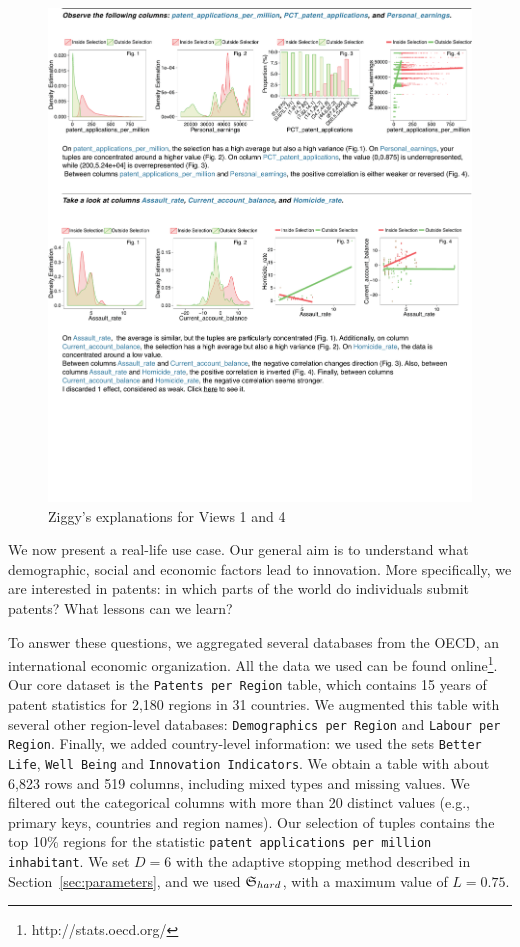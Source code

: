 \begin{figure}[!ht]
  \centering
  \includegraphics[width=1.8\columnwidth]{Figures/ZigUseCase}
  \caption{Ziggy's explanations for Views 1 and 4}
  \label{pic:zigdetail}
\end{figure}
We now present a real-life use case. Our general aim is to understand what
demographic, social and economic factors lead to innovation. More specifically,
we are interested in patents: in which parts of the world do individuals
submit patents? What lessons can we learn?

To answer these questions, we aggregated several databases from the OECD, an
international economic organization. All the data we used can be found
online\footnote{http://stats.oecd.org/}. Our core dataset is the
\texttt{Patents per Region} table, which contains 15 years of patent statistics
for 2,180 regions in 31 countries. We augmented this table with several other
region-level databases: \texttt{Demographics per Region} and \texttt{Labour per
Region}. Finally, we added country-level information: we used the sets
\texttt{Better Life}, \texttt{Well Being} and \texttt{Innovation Indicators}.
We obtain a table with about 6,823 rows and 519 columns, including mixed types
and missing values. We filtered out the categorical columns with
more than 20 distinct values (e.g., primary keys, countries and region names).
Our selection of tuples contains the top 10\% regions for the statistic
\texttt{patent applications per million inhabitant}. We set $D=6$ with the
adaptive stopping method described in Section~\ref{sec:parameters}, and we used
$\mathfrak{S}_{hard}$, with a maximum value of $L=0.75$.

